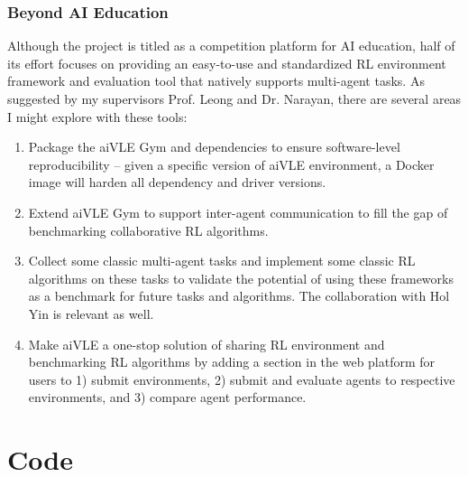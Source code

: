 \documentclass[fyp]{socreport}
\begin{document}
\subsection{Beyond AI Education}
Although the project is titled as a competition platform for AI education, half of its effort focuses on providing an easy-to-use and standardized RL environment framework and evaluation tool that natively supports multi-agent tasks. As suggested by my supervisors Prof. Leong and Dr. Narayan, there are several areas I might explore with these tools:
\begin{enumerate}
    \item Package the aiVLE Gym and dependencies to ensure software-level reproducibility – given a specific version of aiVLE environment, a Docker image will harden all dependency and driver versions.
    \item Extend aiVLE Gym to support inter-agent communication to fill the gap of benchmarking collaborative RL algorithms.
    \item Collect some classic multi-agent tasks and implement some classic RL algorithms on these tasks to validate the potential of using these frameworks as a benchmark for future tasks and algorithms. The collaboration with Hol Yin is relevant as well.
    \item Make aiVLE a one-stop solution of sharing RL environment and benchmarking RL algorithms by adding a section in the web platform for users to 1) submit environments, 2) submit and evaluate agents to respective environments, and 3) compare agent performance.
\end{enumerate}





\appendix
\chapter{Code}

\end{document}

